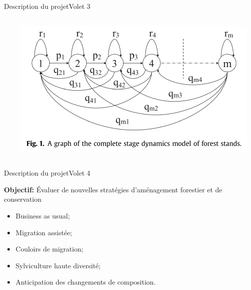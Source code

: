 \documentclass{eecslides}
\begin{document}
\begin{frame}{Description du projet}{Volet 3}
\begin{columns}
\begin{column}{0.5\textwidth}
\begin{center}
				\end{center}	
			\end{column}
			\begin{column}{0.5\textwidth}
				\begin{center}
				\includegraphics[height=0.3\textheight]{markov}\\
				\end{center}
			\end{column}
		\end{columns}	    	
	\end{frame}

	\begin{frame}{Description du projet}{Volet 4}

	\textbf{Objectif:} Évaluer de nouvelles stratégies d'aménagement forestier et de conservation

		\begin{itemize}
			\item Business as usual;
			\item Migration assistée;
			\item Couloirs de migration;
			\item Sylviculture haute diversité;
			\item Anticipation des changements de composition.	
		\end{itemize}
	\end{frame}

\end{document}
